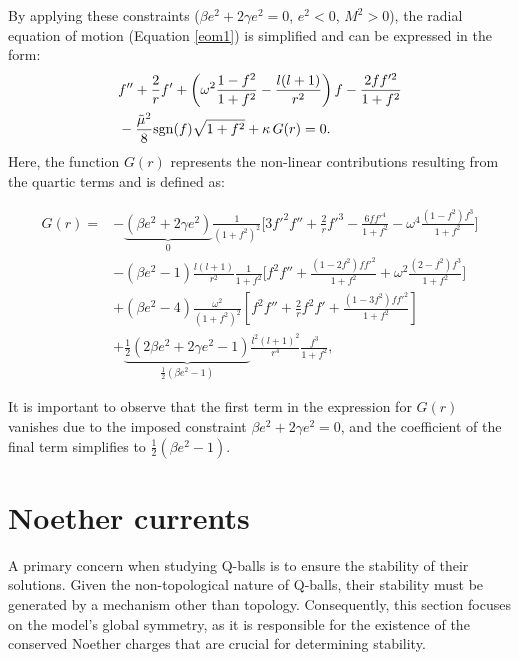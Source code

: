 \documentclass[aps,prd,superscriptaddress,notitlepage,11pt,final,longbibliography,nofootinbib]{revtex4-1}
\numberwithin{equation}{section}
\begin{document}
By applying these constraints ($\beta e^2+2\gamma e^2=0$, $e^2<0$, $M^2>0$), the radial equation of motion (Equation \eqref{eom1}) is simplified and can be expressed in the form:
\begin{align}
&f''+\frac{2}{r}f'+\left(\omega^2\frac{1-f^2}{1+f^2}-\frac{l(l+1)}{r^2}\right)f-\frac{2ff'^2}{1+f^2}\nonumber\\&-\frac{\tilde\mu^2}{8}{\rm sgn}(f)\sqrt{1+f^2}+\kappa \,G(r) =0.\label{eq:radial}
\end{align}
Here, the function $G(r)$ represents the non-linear contributions resulting from the quartic terms and is defined as:
\begin{widetext}
\begin{align}
G(r)=&-\underbrace{(\beta e^2+2\gamma e^2)}_{0}\frac{1}{(1+f^2)^2}\Bigg[3f'^2f''+\frac{2}{r}f'^3-\frac{6ff'^4}{1+f^2}-\omega^4\frac{(1-f^2)f^3}{1+f^2}\Bigg]\nonumber\\
&-(\beta e^2-1)\frac{l(l+1)}{r^2}\frac{1}{1+f^2}\Bigg[f^2f''+\frac{(1-2f^2)ff'^2}{1+f^2}+\omega^2\frac{(2-f^2)f^3}{1+f^2}\Bigg]\nonumber\\
&+(\beta e^2-4)\frac{\omega^2}{(1+f^2)^2}\left[f^2f''+\frac{2}{r}f^2f'+\frac{(1-3f^2)ff'^2}{1+f^2}\right]\nonumber\\
&+\underbrace{{\textstyle\frac{1}{2}}(2\beta e^2+2\gamma e^2-1)}_{\frac{1}{2}(\beta e^2-1)}\frac{l^2(l+1)^2}{r^4}\frac{f^3}{1+f^2},
\end{align}
\end{widetext}
It is important to observe that the first term in the expression for $G(r)$ vanishes due to the imposed constraint $\beta e^2+2\gamma e^2=0$, and the coefficient of the final term simplifies to $\frac{1}{2}(\beta e^2-1)$.

\section{Noether currents}
\label{sec3}
A primary concern when studying Q-balls is to ensure the stability of their solutions. Given the non-topological nature of Q-balls, their stability must be generated by a mechanism other than topology. Consequently, this section focuses on the model's global symmetry, as it is responsible for the existence of the conserved Noether charges that are crucial for determining stability.
\end{document}
